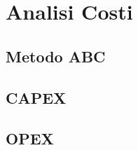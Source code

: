 \chapter[Analisi Costi]{Analisi Costi}

\section[Metodo ABC]{Metodo ABC}
	

\section[CAPEX]{CAPEX}
	

\section[OPEX]{OPEX}
	